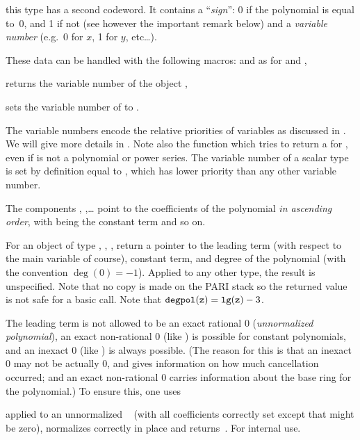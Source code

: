  this
type has a second codeword. It contains a ``\emph{sign}'': 0 if the
polynomial is equal to~0, and 1 if not (see however the important remark
below) and a \emph{variable number} (e.g.~0 for $x$, 1 for $y$, etc\dots).

\noindent These data can be handled with the following macros: 
and  as for  and ,

 returns the variable number of the object ,

 sets the variable number of  to
.

The variable numbers encode the relative priorities of variables as discussed
in . We will give more details in . Note
also the function  which tries to return a
 for , even if  is not a polynomial or
power series. The variable number of a scalar type is set by definition equal
to , which has lower priority than any other variable number.

The components , ,\dots {} point to the
coefficients of the polynomial \emph{in ascending order}, with 
being the constant term and so on.

For an object of type , , ,
 return a pointer to the leading term (with respect to the main
variable of course), constant term, and degree of the polynomial (with the
convention $\deg(0) = -1$). Applied to any other type, the result is
unspecified. Note that no copy is made on the PARI stack so the returned
value is not safe for a basic  call. Note that ${\tt degpol(z)}
= {\tt lg(z)} - 3$.

The leading term is not allowed to be an exact rational $0$
(\emph{unnormalized polynomial}), an exact non-rational $0$ (like
) is possible for constant polynomials, and an inexact $0$
(like ) is always possible. (The reason for this is that
an inexact $0$ may not be actually $0$, and gives information on how much
cancellation occurred; and an exact non-rational $0$ carries information
about the base ring for the polynomial.) To ensure this, one uses

 applied to an unnormalized ~
(with all coefficients correctly set except that  might
be zero), normalizes  correctly in place and returns~. For
internal use.


